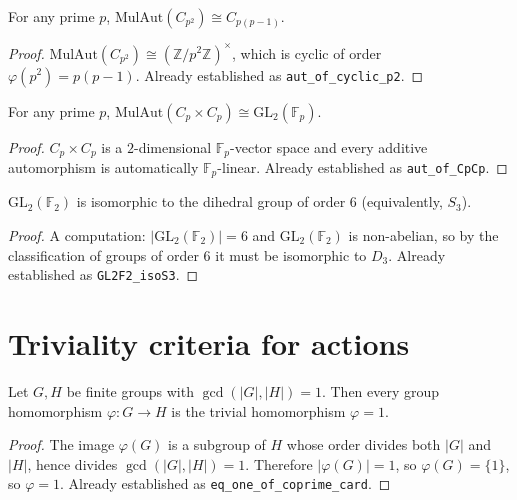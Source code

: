 \begin{lemma}
    \label{lem:aut-cyclic-p2}
    For any prime $p$, $\mathrm{MulAut}(C_{p^2}) \cong C_{p(p-1)}$.
\end{lemma}
\begin{proof}
    $\mathrm{MulAut}(C_{p^2}) \cong (\mathbb{Z}/p^2 \mathbb{Z})^\times$,
    which is cyclic of order $\varphi(p^2) = p(p-1)$. Already established as
    \texttt{aut\_of\_cyclic\_p2}.
\end{proof}

\begin{lemma}
    \label{lem:aut-CpCp}
    For any prime $p$, $\mathrm{MulAut}(C_p \times C_p) \cong
    \mathrm{GL}_2(\mathbb{F}_p)$.
\end{lemma}
\begin{proof}
    $C_p \times C_p$ is a $2$-dimensional $\mathbb{F}_p$-vector space and
    every additive automorphism is automatically $\mathbb{F}_p$-linear.
    Already established as \texttt{aut\_of\_CpCp}.
\end{proof}

\begin{lemma}
    \label{lem:GL2F2-isoS3}
    $\mathrm{GL}_2(\mathbb{F}_2)$ is isomorphic to the dihedral group of
    order $6$ (equivalently, $S_3$).
\end{lemma}
\begin{proof}
    A computation: $|\mathrm{GL}_2(\mathbb{F}_2)| = 6$ and
    $\mathrm{GL}_2(\mathbb{F}_2)$ is non-abelian, so by the classification of
    groups of order $6$ it must be isomorphic to $D_3$. Already established
    as \texttt{GL2F2\_isoS3}.
\end{proof}

\section{Triviality criteria for actions}

\begin{lemma}
    \label{lem:eq-one-of-coprime-card}
    Let $G, H$ be finite groups with $\gcd(|G|, |H|) = 1$. Then every group
    homomorphism $\varphi : G \to H$ is the trivial homomorphism $\varphi = 1$.
\end{lemma}
\begin{proof}
    The image $\varphi(G)$ is a subgroup of $H$ whose order divides both
    $|G|$ and $|H|$, hence divides $\gcd(|G|,|H|) = 1$. Therefore
    $|\varphi(G)| = 1$, so $\varphi(G) = \{1\}$, so $\varphi = 1$.
    Already established as \texttt{eq\_one\_of\_coprime\_card}.
\end{proof}

